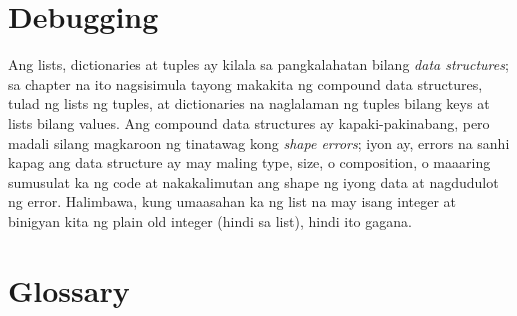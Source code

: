 \documentclass[10pt,]{book}
\begin{document}

\section{Debugging}\label{debugging-9}

  

Ang lists, dictionaries at tuples ay kilala sa pangkalahatan bilang
\emph{data structures}; sa chapter na ito nagsisimula tayong makakita ng
compound data structures, tulad ng lists ng tuples, at dictionaries na
naglalaman ng tuples bilang keys at lists bilang values. Ang compound
data structures ay kapaki-pakinabang, pero madali silang magkaroon ng
tinatawag kong \emph{shape errors}; iyon ay, errors na sanhi kapag ang
data structure ay may maling type, size, o composition, o maaaring
sumusulat ka ng code at nakakalimutan ang shape ng iyong data at
nagdudulot ng error. Halimbawa, kung umaasahan ka ng list na may isang
integer at binigyan kita ng plain old integer (hindi sa list), hindi ito
gagana.

\section{Glossary}\label{glossary-9}
\end{document}
